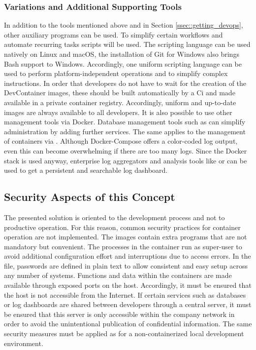         \subsubsection{Variations and Additional Supporting Tools}
        In addition to the tools mentioned above and in Section \ref{ssec::getting_devops}, other auxiliary programs can be used. To simplify certain workflows and automate recurring tasks scripts will be used. The  scripting language can be used natively on Linux and macOS, the installation of Git for Windows also brings Bash support to Windows. Accordingly, one uniform scripting language can be used to perform platform-independent operations and to simplify complex instructions. In order that developers do not have to wait for the creation of the DevContainer images, these should be built automatically by a Ci and made available in a private container registry. Accordingly, uniform and up-to-date images are always available to all developers. \newline
        It is also possible to use other management tools via Docker. Database management tools such as  can simplify administration by adding further services. The same applies to the management of containers via . Although Docker-Compose offers a color-coded log output, even this can become overwhelming if there are too many logs. Since the Docker stack is used anyway, enterprise log aggregators and analysis tools like  or  can be used to get a persistent and searchable log dashboard.

    \subsection{Security Aspects of this Concept}\label{ssec::sec}
    The presented solution is oriented to the development process and not to productive operation. For this reason, common security practices for container operation are not implemented. The images contain extra programs that are not mandatory but convenient. The processes in the container run as super-user to avoid additional configuration effort and interruptions due to access errors. In the  file, passwords are defined in plain text to allow consistent and easy setup across any number of systems. Functions and data within the containers are made available through exposed ports on the host. Accordingly, it must be ensured that the host is not accessible from the Internet. If certain services such as databases or log dashboards are shared between developers through a central server, it must be ensured that this server is only accessible within the company network in order to avoid the unintentional publication of confidential information. The same security measures must be applied as for a non-containerized local development environment.

